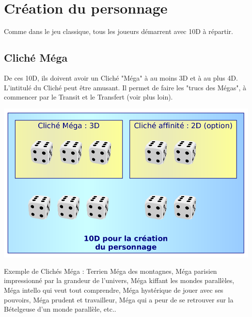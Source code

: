 \documentclass[11pt]{article}
\begin{document}
\vspace{0.2cm}


\tableofcontents

\newpage
\pagestyle{fancy}

\section{Création du personnage}

Comme dans le jeu classique, tous les joueurs démarrent avec 10D à répartir. 

\subsection{Cliché Méga}

De ces 10D, ils doivent avoir un Cliché "Méga" à au moins 3D et à au plus 4D. L'intitulé du Cliché peut être amusant. Il permet de faire les "trucs des Mégas", à commencer par le Transit et le Transfert (voir plus loin).

\begin{center}
\includegraphics[scale=0.28]{01-creation-perso}
\end{center}

Exemple de Clichés Méga : Terrien Méga des montagnes, Méga parisien impressionné par la grandeur de l'univers, Méga kiffant les mondes parallèles, Méga intello qui veut tout comprendre, Méga hystérique de jouer avec ses pouvoirs, Méga prudent et travailleur, Méga qui a peur de se retrouver sur la Bételgeuse d'un monde parallèle, etc.. 
\end{document}

